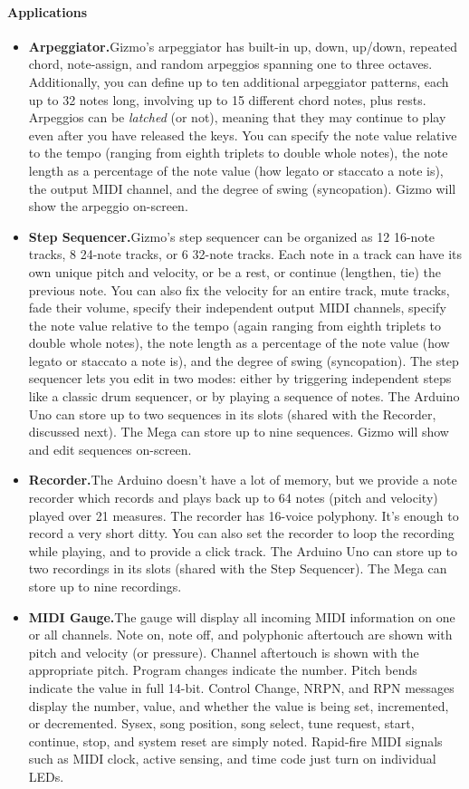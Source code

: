 \documentclass{article}
\begin{document}
\paragraph{Applications}
\begin{itemize}
\item {\bf Arpeggiator.}\quad Gizmo's arpeggiator has built-in up, down, up/down, repeated chord, note-assign, and random arpeggios spanning one to three octaves.  Additionally, you can define up to ten additional arpeggiator patterns, each up to 32 notes long, involving up to 15 different chord notes, plus rests.  Arpeggios can be {\it latched} (or not), meaning that they may continue to play even after you have released the keys.  You can specify  the note value relative to the tempo (ranging from eighth triplets to double whole notes), the note length as a percentage of the note value (how legato or staccato a note is), the output MIDI channel, and the degree of swing (syncopation).  Gizmo will show the arpeggio on-screen.
\item {\bf Step Sequencer.}\quad Gizmo's step sequencer can be organized as 12 16-note tracks, 8 24-note tracks, or 6 32-note tracks.  Each note in a track can have its own unique pitch and velocity, or be a rest, or continue (lengthen, tie) the previous note.  You can also fix the velocity for an entire track, mute tracks, fade their volume, specify their independent output MIDI channels, specify the note value relative to the tempo (again ranging from eighth triplets to double whole notes), the note length as a percentage of the note value (how legato or staccato a note is), and the degree of swing (syncopation).    The step sequencer lets you edit in two modes: either by triggering independent steps like a classic drum sequencer, or by playing a sequence of notes.  The Arduino Uno can store up to two sequences in its slots (shared with the Recorder, discussed next).  The Mega can store up to nine sequences.  Gizmo will show and edit sequences on-screen.
\item {\bf Recorder.}\quad The Arduino doesn't have a lot of memory, but we provide a note recorder which records and plays back up to 64 notes (pitch and velocity) played over 21 measures. The recorder has 16-voice polyphony.   It's enough to record a very short ditty.  You can also set the recorder to loop the recording while playing, and to provide a click track.  The Arduino Uno can store up to two recordings in its slots (shared with the Step Sequencer).  The Mega can store up to nine recordings.
\item {\bf MIDI Gauge.}\quad The gauge will display all incoming MIDI information on one or all channels.  Note on, note off, and polyphonic aftertouch are shown with pitch and velocity (or pressure).  Channel aftertouch is shown with the appropriate pitch.  Program changes indicate the number.  Pitch bends indicate the value in full 14-bit.  Control Change, NRPN, and RPN messages display the number, value, and whether the value is being set, incremented, or decremented.  Sysex, song position, song select, tune request, start, continue, stop, and system reset are simply noted.  Rapid-fire MIDI signals such as MIDI clock, active sensing, and time code just turn on individual LEDs.

\end{itemize}
\end{document}
